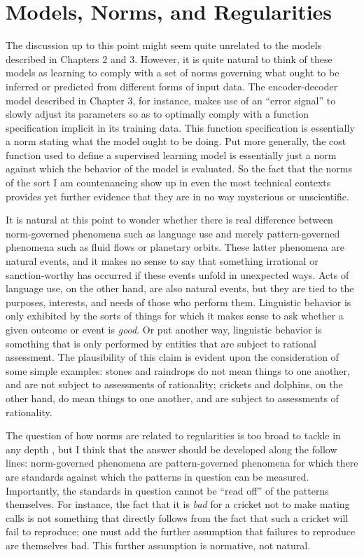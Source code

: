\section{Models, Norms, and Regularities}

The discussion up to this point might seem quite unrelated to the models described in Chapters 2 and 3. However, it is quite natural to think of these models as learning to comply with a set of norms governing what ought to be inferred or predicted from different forms of input data. The encoder-decoder model described in Chapter 3, for instance, makes use of an ``error signal'' to slowly adjust its parameters so as to optimally comply with a function specification implicit in its training data. This function specification is essentially a norm stating what the model ought to be doing. Put more generally, the cost function used to define a supervised learning model is essentially just a norm against which the behavior of the model is evaluated. So the fact that the norms of the sort I am countenancing show up in even the most technical contexts provides yet further evidence that they are in no way mysterious or unscientific. 

It is natural at this point to wonder whether there is real difference between norm-governed phenomena such as language use and merely pattern-governed phenomena such as fluid flows or planetary orbits. These latter phenomena are natural events, and it makes no sense to say that something irrational or sanction-worthy has occurred if these events unfold in unexpected ways. Acts of language use, on the other hand, are also natural events, but they are tied to the purposes, interests, and needs of those who perform them. Linguistic behavior is only exhibited by the sorts of things for which it makes sense to ask whether a given outcome or event is \textit{good}. Or put another way, linguistic behavior is something that is only performed by entities that are subject to rational assessment. The plausibility of this claim is evident upon the consideration of some simple examples: stones and raindrops do not mean things to one another, and are not subject to assessments of rationality; crickets and dolphins, on the other hand, do mean things to one another, and are subject to assessments of rationality. 

The question of how norms are related to regularities is too broad to tackle in any depth \citep[see][]{Brandom:1994,Kripke:1982}, but I think that the answer should be developed along the follow lines: norm-governed phenomena are pattern-governed phenomena for which there are standards against which the patterns in question can be measured. Importantly, the standards in question cannot be ``read off'' of the patterns themselves. For instance, the fact that it is \textit{bad} for a cricket not to make mating calls is not something that directly follows from the fact that such a cricket will fail to reproduce; one must add the further assumption that failures to reproduce are themselves bad. This further assumption is normative, not natural. 

